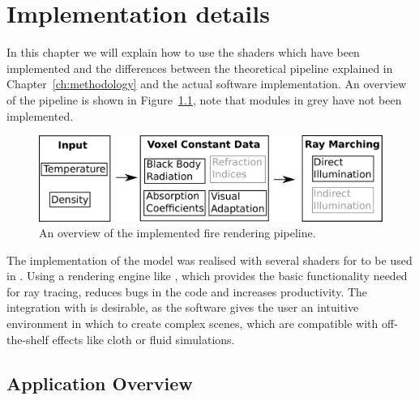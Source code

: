 \chapter{Implementation details}
\label{ch:implementation_details}

In this chapter we will explain how to use the shaders which have been implemented and the differences between the theoretical pipeline explained in Chapter~\ref{ch:methodology} and the actual software implementation.
An overview of the pipeline is shown in Figure~\ref{fig:pipeline_simplified}, note that modules in grey have not been implemented.

\begin{figure}[htbp!]
	\centering
	\includegraphics[width=\textwidth]{img/pipeline_simplified}
	\caption{An overview of the implemented fire rendering pipeline.}
	\label{fig:pipeline_simplified}
\end{figure}

The implementation of the model was realised with several shaders for \MentalRay to be used in \Mayash.
Using a rendering engine like \MentalRaysh, which provides the basic functionality needed for ray tracing, reduces bugs in the code and increases productivity.
The integration with \Maya is desirable, as the software gives the user an intuitive environment in which to create complex scenes, which are compatible with off-the-shelf effects like cloth or fluid simulations. 

\section{Application Overview}
\label{sec:application_overview}

